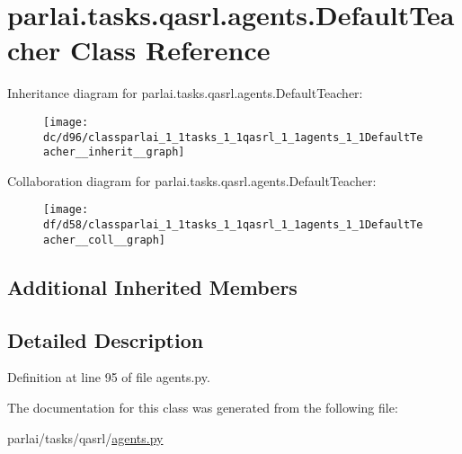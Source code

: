 \hypertarget{classparlai_1_1tasks_1_1qasrl_1_1agents_1_1DefaultTeacher}{}\section{parlai.\+tasks.\+qasrl.\+agents.\+Default\+Teacher Class Reference}
\label{classparlai_1_1tasks_1_1qasrl_1_1agents_1_1DefaultTeacher}


Inheritance diagram for parlai.\+tasks.\+qasrl.\+agents.\+Default\+Teacher\+:\nopagebreak
\begin{figure}[H]
\begin{center}
\leavevmode
\texttt{[image: dc/d96/classparlai\_1\_1tasks\_1\_1qasrl\_1\_1agents\_1\_1DefaultTeacher\_\_inherit\_\_graph]}
\end{center}
\end{figure}


Collaboration diagram for parlai.\+tasks.\+qasrl.\+agents.\+Default\+Teacher\+:\nopagebreak
\begin{figure}[H]
\begin{center}
\leavevmode
\texttt{[image: df/d58/classparlai\_1\_1tasks\_1\_1qasrl\_1\_1agents\_1\_1DefaultTeacher\_\_coll\_\_graph]}
\end{center}
\end{figure}
\subsection*{Additional Inherited Members}


\subsection{Detailed Description}


Definition at line 95 of file agents.\+py.



The documentation for this class was generated from the following file\+:\begin{DoxyCompactItemize}
\item 
parlai/tasks/qasrl/\hyperlink{parlai_2tasks_2qasrl_2agents_8py}{agents.\+py}\end{DoxyCompactItemize}
